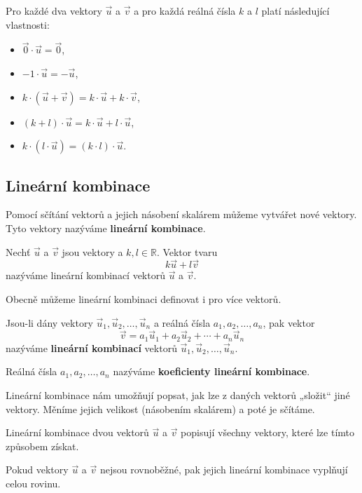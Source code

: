 \begin{definition}
    Pro každé dva vektory $\vec{u}$ a $\vec{v}$ a pro každá reálná čísla $k$ a $l$ platí následující vlastnosti:
    \begin{itemize}
        \item $\vec{0} \cdot \vec{u} = \vec{0}$,
        \item $-1 \cdot \vec{u} = -\vec{u}$,
        \item $k \cdot (\vec{u} + \vec{v}) = k \cdot \vec{u} + k \cdot \vec{v}$,
        \item $(k + l) \cdot \vec{u} = k \cdot \vec{u} + l \cdot \vec{u}$,
        \item $k \cdot (l \cdot \vec{u}) = (k \cdot l) \cdot \vec{u}$.
    \end{itemize}
\end{definition}


\subsection{Lineární kombinace}\label{subsec:Linear_combinations}

Pomocí sčítání vektorů a jejich násobení skalárem můžeme vytvářet nové vektory.
Tyto vektory nazýváme \textbf{lineární kombinace}.

\begin{definition}\label{def:linear_combination}
    Nechť $\vec{u}$ a $\vec{v}$ jsou vektory a $k, l \in \mathbb{R}$.
    Vektor tvaru
    \begin{equation}\label{eq:linear_combination}
        k\vec{u} + l\vec{v}
    \end{equation}
    nazýváme lineární kombinací vektorů $\vec{u}$ a $\vec{v}$.
\end{definition}

\begin{remark}
    Obecně můžeme lineární kombinaci definovat i pro více vektorů.

    Jsou-li dány vektory $\vec{u}_1, \vec{u}_2, \ldots, \vec{u}_n$ a reálná čísla $a_1, a_2, \ldots, a_n$,
    pak vektor
    \[
    \vec{v} = a_1 \vec{u}_1 + a_2 \vec{u}_2 + \cdots + a_n \vec{u}_n
    \]
    nazýváme \textbf{lineární kombinací} vektorů $\vec{u}_1, \vec{u}_2, \ldots, \vec{u}_n$.

    Reálná čísla $a_1, a_2, \ldots, a_n$ nazýváme \textbf{koeficienty lineární kombinace}.
\end{remark}

\begin{remark}
Lineární kombinace nám umožňují popsat, jak lze z daných vektorů „složit“ jiné vektory.
Měníme jejich velikost (násobením skalárem) a poté je sčítáme.

Lineární kombinace dvou vektorů $\vec{u}$ a $\vec{v}$ popisují všechny vektory,
které lze tímto způsobem získat.

Pokud vektory $\vec{u}$ a $\vec{v}$ nejsou rovnoběžné,
pak jejich lineární kombinace vyplňují celou rovinu.
\end{remark}

